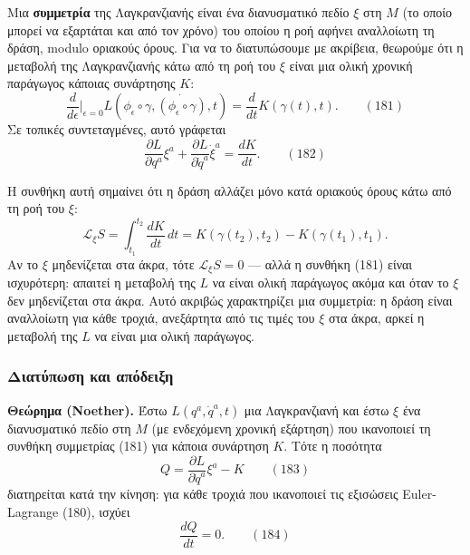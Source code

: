 \documentclass[12pt]{article}
\begin{document}
Μια \textbf{συμμετρία} της Λαγκρανζιανής είναι ένα διανυσματικό πεδίο $\xi$ στη $M$ (το οποίο μπορεί να εξαρτάται και από τον χρόνο) του οποίου η ροή αφήνει αναλλοίωτη τη δράση, modulo οριακούς όρους. Για να το διατυπώσουμε με ακρίβεια, θεωρούμε ότι η μεταβολή της Λαγκρανζιανής κάτω από τη ροή του $\xi$ είναι μια ολική χρονική παράγωγος κάποιας συνάρτησης $K$:
\begin{equation}
\frac{d}{d\epsilon} \bigg|_{\epsilon=0} L(\phi_\epsilon \circ \gamma, \dot{(\phi_\epsilon \circ \gamma)}, t) = \frac{d}{dt} K(\gamma(t), t). \qquad (181)
\end{equation}
Σε τοπικές συντεταγμένες, αυτό γράφεται
\begin{equation}
\frac{\partial L}{\partial q^a} \xi^a + \frac{\partial L}{\partial \dot{q}^a} \dot{\xi}^a = \frac{dK}{dt}. \qquad (182)
\end{equation}

Η συνθήκη αυτή σημαίνει ότι η δράση αλλάζει μόνο κατά οριακούς όρους κάτω από τη ροή του $\xi$:
\[
\mathcal{L}_\xi S = \int_{t_1}^{t_2} \frac{dK}{dt} \, dt = K(\gamma(t_2), t_2) - K(\gamma(t_1), t_1).
\]
Αν το $\xi$ μηδενίζεται στα άκρα, τότε $\mathcal{L}_\xi S = 0$ — αλλά η συνθήκη (181) είναι ισχυρότερη: απαιτεί η μεταβολή της $L$ να είναι ολική παράγωγος ακόμα και όταν το $\xi$ δεν μηδενίζεται στα άκρα. Αυτό ακριβώς χαρακτηρίζει μια συμμετρία: η δράση είναι αναλλοίωτη για κάθε τροχιά, ανεξάρτητα από τις τιμές του $\xi$ στα άκρα, αρκεί η μεταβολή της $L$ να είναι μια ολική παράγωγος.

\subsubsection{Διατύπωση και απόδειξη}

\textbf{Θεώρημα (Noether).} Έστω $L(q^a, \dot{q}^a, t)$ μια Λαγκρανζιανή και έστω $\xi$ ένα διανυσματικό πεδίο στη $M$ (με ενδεχόμενη χρονική εξάρτηση) που ικανοποιεί τη συνθήκη συμμετρίας (181) για κάποια συνάρτηση $K$. Τότε η ποσότητα
\begin{equation}
Q = \frac{\partial L}{\partial \dot{q}^a} \xi^a - K \qquad (183)
\end{equation}
διατηρείται κατά την κίνηση: για κάθε τροχιά που ικανοποιεί τις εξισώσεις Euler-Lagrange (180), ισχύει
\begin{equation}
\frac{dQ}{dt} = 0. \qquad (184)
\end{equation}
\end{document}
